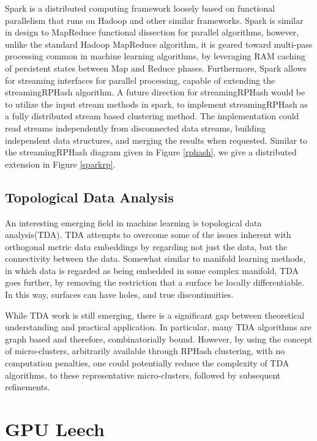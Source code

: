 Spark is a distributed computing framework loosely based on functional parallelism that runs on
Hadoop and other similar frameworks.  Spark is similar in design to MapReduce functional dissection
for parallel algorithms, however, unlike the standard Hadoop MapReduce algorithm, it is geared toward
multi-pass processing common in machine learning algorithms, by leveraging RAM caching of persistent
states between Map and Reduce phases.  Furthermore, Spark allows for streaming interfaces for
parallel processing, capable of extending the \textsf{streamingRPHash} algorithm.  A future direction
for \textsf{streamingRPHash} would be to utilize the input stream methods in spark, to implement 
\textsf{streamingRPHash} as a fully distributed stream based clustering method.  The implementation could read
streams independently from disconnected data streams, building independent data structures, and merging the 
results when requested.  Similar to the \textsf{streamingRPHash} diagram given in Figure \ref{rphash}, we give a 
distributed extension in Figure \ref{sparkrp}. 

\subsection{Topological Data Analysis}

An interesting emerging field in machine learning is topological data analysis(TDA). TDA attempts to
overcome some of the issues inherent with orthogonal metric data embeddings by regarding not just
the data, but the connectivity between the data.  Somewhat similar to manifold learning methods, in
which data is regarded as being embedded in some complex manifold, TDA goes further, by removing the
restriction that a surface be locally differentiable. In this way, surfaces can have holes, and true
discontinuities.

While TDA work is still emerging, there is a significant gap between theoretical understanding and
practical application.  In particular, many TDA algorithms are graph based and therefore,
combinatorially bound.  However, by using the concept of micro-clusters, arbitrarily available through
\textsf{RPHash} clustering, with no computation penalties, one could potentially reduce the complexity of
TDA algorithms, to these representative micro-clusters, followed by subsequent refinements. 

\section{GPU Leech}

